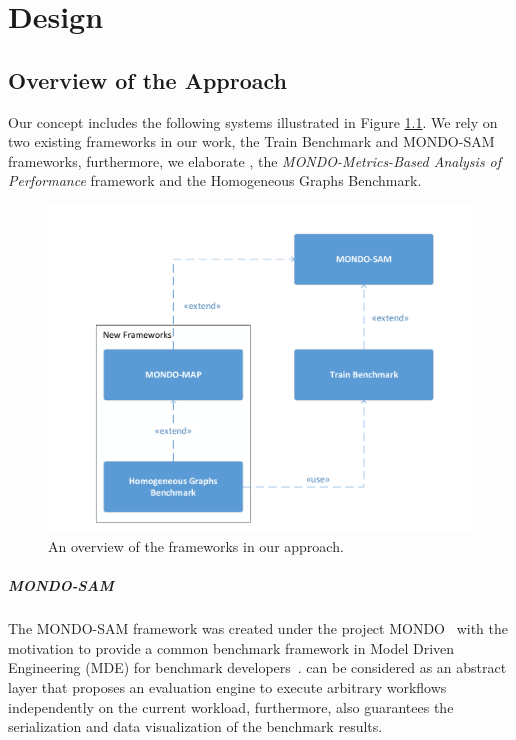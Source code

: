 \chapter{Design}

\section{Overview of the Approach}
Our concept includes the following systems illustrated in Figure \ref{fig:frameworks}. We rely on two existing frameworks in our work, the Train Benchmark and MONDO-SAM frameworks, furthermore, we elaborate \framework, the \textit{MONDO-Metrics-Based Analysis of Performance} framework and the Homogeneous Graphs Benchmark.
\begin{figure}[!ht]
	\centering
	\includegraphics[width=130mm, keepaspectratio]{figures/frameworks.pdf}
	\caption{An overview of the frameworks in our approach.}
	\label{fig:frameworks}
\end{figure}

\paragraph{MONDO-SAM}
The MONDO-SAM framework was created under the project MONDO~\cite{mondo} with the motivation to provide a common benchmark framework in Model Driven Engineering (MDE) for benchmark developers~\cite{mondo-sam}. \sam can be considered as an abstract layer that proposes an evaluation engine to execute arbitrary workflows independently on the current workload, furthermore, \sam also guarantees the serialization and data visualization of the benchmark results.

